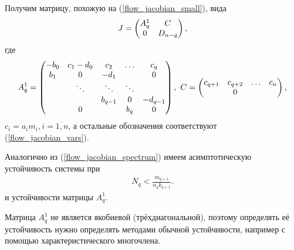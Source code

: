 Получим матрицу, похожую на (\ref{flow_jacobian_small}), вида
\begin{equation} \label{cycle_stability_matrix}
    J = \left(  \begin{matrix}
        A^1_q & C \\
        0 & D_{n-q}
    \end{matrix}  \right),
\end{equation}
где
\begin{equation}
    A^1_q = \left(  \begin{matrix}
            -b_0  & c_1-d_0&   c_2    &  \dots   & c_q      \\
            b_1  &  0     &  -d_1    &          &  0       \\
                    & \ddots & \ddots   &  \ddots  &          \\
                    &        & b_{q-1}  &     0    & -d_{q-1} \\
                    &   0    &          & b_{q}    &  0  
    \end{matrix}  \right), ~
    C = \left(  \begin{matrix}
        c_{q+1} & c_{q+2} & \dots & c_{n} \\
                &    0    &       &
    \end{matrix}  \right),
\end{equation}
\( c_i = a_i m_i, i = \overline{1,n} \), а остальные обозначения соответствуют (\ref{flow_jacobian_vars}).

Аналогично из (\ref{flow_jacobian_spectrum}) имеем асимптотическую устойчивость системы при
\begin{align} \label{cycle_nq_upper}
    N_q < \frac{m_{q+1}}{\alpha_q k_{q+1}}.
\end{align}
и устойчивости матрицы \( A^1_q \).

Матрица \(A^1_q\) не является якобиевой (трёхдиагональной), поэтому определять её устойчивость нужно определять методами обычной устойчивости, например с помощью характеристического многочлена.

